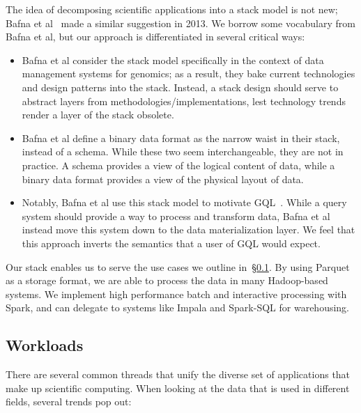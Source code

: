 \documentclass{acm_proc_article-sp}
\begin{document}
The idea of decomposing scientific applications into a stack model is not new; Bafna et al~\cite{bafna13}
made a similar suggestion in 2013. We borrow some vocabulary from Bafna et al, but our approach is
differentiated in several critical ways:

\begin{itemize}
\item Bafna et al consider the stack model specifically in the context of data management systems for
genomics; as a result, they bake current technologies and design patterns into the stack. Instead, a stack
design should serve to abstract layers from methodologies/implementations, lest technology trends render
a layer of the stack obsolete.
\item Bafna et al define a binary data format as the narrow waist in their stack, instead of a schema.
While these two seem interchangeable, they are not in practice. A schema provides a view of the logical content
of data, while a binary data format provides a view of the physical layout of data.
\item Notably, Bafna et al use this stack model to motivate GQL~\cite{kozanitis14}. While a query system
should provide a way to process and transform data, Bafna et al instead move this system down to the
data materialization layer. We feel that this approach inverts the semantics that a user of GQL would expect.
\end{itemize}

Our stack enables us to serve the use cases we outline in~\S\ref{sec:workloads}. By using
Parquet as a storage format, we are able to process the data in many Hadoop-based systems. We
implement high performance batch and interactive processing with \linebreak Spark, and can delegate to systems
like Impala and Spark-SQL for warehousing.

\subsection{Workloads}
\label{sec:workloads}

There are several common threads that unify the diverse set of applications that make up scientific
computing. When looking at the data that is used in different fields, several trends pop out:
\end{document}
